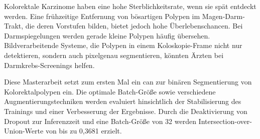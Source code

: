 Kolorektale Karzinome haben eine hohe Sterblichkeitsrate, wenn sie spät entdeckt werden.
Eine frühzeitige Entfernung von bösartigen Polypen im Magen-Darm-Trakt, die deren Vorstufen bilden, bietet jedoch hohe Überlebenschancen.
Bei Darmspiegelungen werden gerade kleine Polypen häufig übersehen.
Bildverarbeitende Systeme, die Polypen in einem Koloskopie-Frame nicht nur detektieren, sondern auch pixelgenau segmentieren, könnten Ärzten bei Darmkrebs-Screenings helfen.

Diese Masterarbeit setzt zum ersten Mal ein \acrlong{can} zur binären Segmentierung von Kolorektalpolypen ein.
Die optimale Batch-Größe sowie verschiedene Augmentierungstechniken werden evaluiert hinsichtlich der Stabilisierung des Trainings und einer Verbesserung der Ergebnisse.
Durch die Deaktivierung von Dropout zur Inferenzzeit und eine Batch-Größe von 32 werden Intersection-over-Union-Werte von bis zu 0,3681 erzielt.

